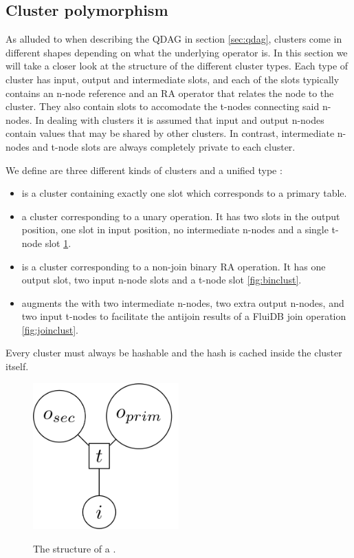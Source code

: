 \subsection{Cluster polymorphism}
\label{sec:cluster_polymorphism}

As alluded to when describing the QDAG in section \ref{sec:qdag},
clusters come in different shapes depending on what the underlying
operator is. In this section we will take a closer look at the
structure of the different cluster types. Each type of cluster has
input, output and intermediate slots, and each of the slots typically
contains an n-node reference and an
RA operator that relates
the node to the cluster. They also contain slots to accomodate the
t-nodes connecting said n-nodes. In dealing with clusters it is
assumed that input and output n-nodes contain values that may be shared
by other clusters. In contrast, intermediate n-nodes and t-node slots are
always completely private to each cluster.

We define are three different kinds of clusters and a unified type
:

\begin{itemize}
\item {} is a cluster containing exactly one slot which
  corresponds to a primary table.
\item {} a cluster corresponding to a unary operation. It
  has two slots in the output position, one slot in input position, no
  intermediate n-nodes and a single t-node slot \ref{fig:unclust}.
\item {} is a cluster corresponding to a non-join binary
  RA operation. It has one output slot, two input n-node slots and a t-node
  slot \ref{fig:binclust}.
\item {} augments the  with two
  intermediate n-nodes, two extra output n-nodes, and two input t-nodes to
  facilitate the antijoin results of a FluiDB join operation
  \ref{fig:joinclust}.
\end{itemize}

Every cluster must always be hashable and the hash is cached inside
the cluster itself.

\begin{figure}[H]
  \centering
  \includegraphics[width=0.5\textwidth]{./imgs/unclust.pdf}
  \label{fig:unclust}
  \caption{The structure of a .}
\end{figure}


